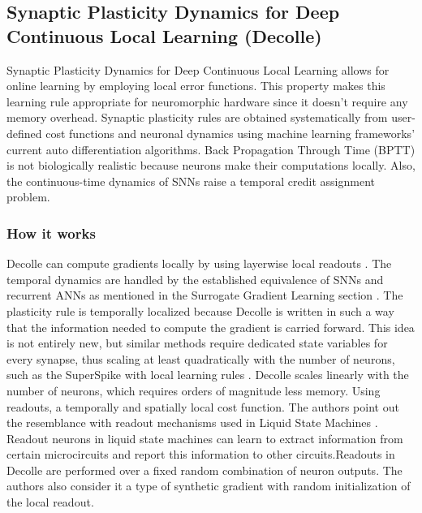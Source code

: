 \documentclass[12pt]{report}
\begin{document}
\subsection{Synaptic Plasticity Dynamics for Deep Continuous Local Learning (Decolle)}
Synaptic Plasticity Dynamics for Deep Continuous Local Learning \cite{kaiser2020} allows for online learning by employing local error functions. This property makes this learning rule appropriate for neuromorphic hardware since it doesn't require any memory overhead. Synaptic plasticity rules are obtained systematically from user-defined cost functions and neuronal dynamics using machine learning frameworks' current auto differentiation algorithms. Back Propagation Through Time (BPTT) is not biologically realistic because neurons make their computations locally. Also, the continuous-time dynamics of SNNs raise a temporal credit assignment problem.
\subsubsection{How it works}
Decolle can compute gradients locally by using layerwise local readouts \cite{neftci2017}. The temporal dynamics are handled by the established equivalence of SNNs and recurrent ANNs as mentioned in the Surrogate Gradient Learning section \cite{neftci2019}. The plasticity rule is temporally localized because Decolle is written in such a way that the information needed to compute the gradient is carried forward. This idea is not entirely new, but similar methods require dedicated state variables for every synapse, thus scaling at least quadratically with the number of neurons, such as the SuperSpike with local learning rules . Decolle scales linearly with the number of neurons, which requires orders of magnitude less memory. Using readouts, a temporally and spatially local cost function. The authors point out the resemblance with readout mechanisms used in Liquid State Machines \cite{markram2002}. Readout neurons in liquid state machines can learn to extract information from certain microcircuits and report this information to other circuits.Readouts in Decolle are performed over a fixed random combination of neuron outputs. The authors also consider it a type of synthetic gradient with random initialization of the local readout.
\end{document}
